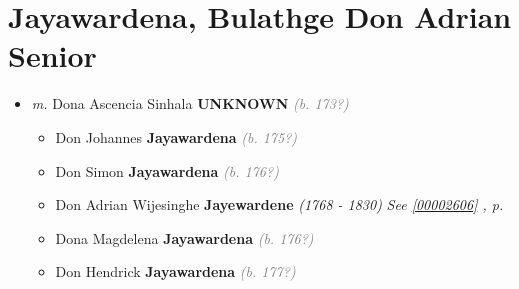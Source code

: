 \documentclass[10pt, openany]{book}
\begin{document}
\chapter{Jayawardena, Bulathge Don Adrian Senior}
\label{00003003}
\textcolor{slmaroon}{\textit{}}
\begin{itemize}
\item{\textit{m.} Dona Ascencia Sinhala \textbf{UNKNOWN} \textcolor{gray}{\textit{(b. 173?)}}   \label{couple:00003003:00003004} \begin{itemize}
\item{Don Johannes \textbf{Jayawardena} \textcolor{gray}{\textit{(b. 175?)}}
  }
\item{Don Simon \textbf{Jayawardena} \textcolor{gray}{\textit{(b. 176?)}}
  }
\item{Don Adrian Wijesinghe \textbf{Jayewardene} \textcolor{slorange}{\textit{(1768 - 1830)}} \textcolor{slteal}{\textit{See  \autoref{00002606} \textit{, p. \pageref{00002606} }}}}
\item{Dona Magdelena \textbf{Jayawardena} \textcolor{gray}{\textit{(b. 176?)}}
  }
\item{Don Hendrick \textbf{Jayawardena} \textcolor{gray}{\textit{(b. 177?)}}
  }
\end{itemize}}
\end{itemize}
    
\end{document}
